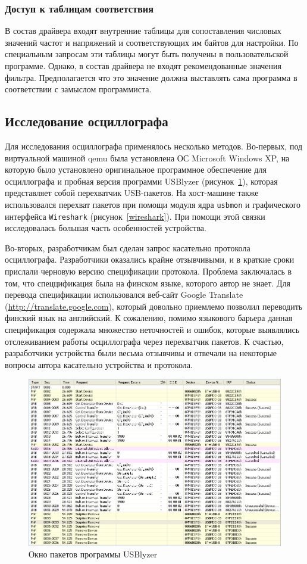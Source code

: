 \documentclass[a4paper,12pt]{report}
\numberwithin{equation}{section}
\begin{document}
\subsubsection{Доступ к таблицам соответствия}
В состав драйвера входят внутренние таблицы для сопоставления числовых значений
частот и напряжений и соответствующих им байтов для настройки. По специальным
запросам эти таблицы могут быть получены в пользовательской программе. Однако, в
состав драйвера не входят рекомендованные значения фильтра. Предполагается что
это значение должна выставлять сама программа в соответствии с замыслом
программиста.

\subsection{Исследование осциллографа}
Для исследования осциллографа применялось несколько методов. Во-первых, под
виртуальной машиной qemu была установлена ОС Microsoft Windows XP, на которую
было установлено оригинальное программное обеспечение для осциллографа и пробная
версия программи USBlyzer (рисунок~\ref{usblyzer}), которая представляет собой
перехватчик USB-пакетов. На хост-машине также использовался перехват пакетов при
помощи модуля ядра \texttt{usbmon} и графического интерфейса \texttt{Wireshark}
(рисунок~\ref{wireshark}). При помощи этой связки исследовалась большая часть
особенностей устройства.

Во-вторых, разработчикам был сделан запрос касательно протокола
осциллографа. Разработчики оказались крайне отзывчивыми, и в краткие сроки
прислали черновую версию спецификации протокола. Проблема заключалась в том, что
спеццификация была на финском языке, которого автор не знает. Для перевода
спецификации использовался веб-сайт Google Translate
(\url{http://translate.google.com}), который довольно приемлемо позволил
переводить финский язык на английский. К сожалению, помимо языкового барьера
данная спецификация содержала множество неточностей и ошибок, которые выявлялись
отслеживанием работы осциллографа через перехватчик пакетов. К счастью,
разработчики устройства были весьма отзывчивы и отвечали на некоторые вопросы
автора касательно устройства и протокола.

\begin{figure}[h!]
\centering
\includegraphics[width=\textwidth]{usblyzer}
\caption{Окно пакетов программы USBlyzer}
\label{usblyzer}
\end{figure}
\end{document}
